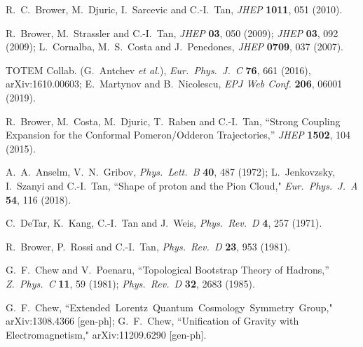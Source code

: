 \documentclass[11pt, oneside]{article}   	%
\newcommand{\<}{\langle}
\renewcommand{\>}{\rangle}
\numberwithin{equation}{section}
\numberwithin{figure}{section}
\begin{document}
\begin{thebibliography}{99}
    
 
  R.~C.~Brower, M.~Djuric, I.~Sarcevic and C.-I.~Tan,
  {\it JHEP} {\bf 1011}, 051 (2010).
    
   R.~Brower,  M.~Strassler and C.-I.~Tan, 
{\it  JHEP} {\bf 03}, 050 (2009); %
{\it  JHEP } {\bf 03}, 092 (2009);   L.~Cornalba, M.~S.~Costa and J.~Penedones,
{\it   JHEP} {\bf 0709}, 037 (2007).


 TOTEM Collab. (G.~Antchev {\it et al.}),  {\it Eur.~Phys.~J.~C} {\bf 76}, 661 (2016), arXiv:1610.00603;
 E.~Martynov and B.~Nicolescu,
{\it EPJ Web Conf.} \textbf{206}, 06001 (2019).

       R.~Brower, M.~Costa, M.~Djuric, T.~Raben and C.-I.~Tan,
  ``Strong Coupling Expansion for the Conformal Pomeron/Odderon Trajectories,''
 {\it  JHEP} {\bf 1502}, 104 (2015).      

 A.~A.~Anselm, V.~N.~Gribov, {\it Phys.~Lett.~B} {\bf40}, 487 (1972);
 L.~Jenkovzsky, I.~Szanyi and C.-I.~Tan,
``Shape of proton and the Pion Cloud,"
{\it Eur.~Phys.~J.~A} \textbf{54}, 116 (2018). %




     

   

 C.~DeTar, K.~Kang, C.-I.~Tan and J.~Weis, 
{\it Phys.~Rev.~D} {\bf 4}, 257 (1971).


    
    


   R.~Brower, P.~Rossi and C.-I.~Tan, %
    {\it Phys.~Rev.~D} \textbf{23}, 953 (1981).
     

G.~F.~Chew and V.~Poenaru,
``Topological Bootstrap Theory of Hadrons,''
{\it Z.~Phys.~C} \textbf{11}, 59 (1981); 
 {\it Phys.~Rev.~D} {\bf 32}, 2683 (1985).

G.~F.~Chew, ``Extended~Lorentz~Quantum~Cosmology~Symmetry~Group,"
  arXiv:1308.4366 [gen-ph]; G.~F.~Chew, 
  ``Unification of Gravity with Electromagnetism,"
 arXiv:11209.6290 [gen-ph].
  
  

 
\end{thebibliography}
\end{document}
